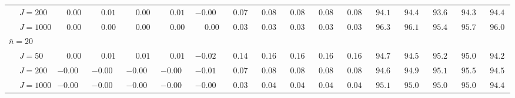 \begin{sidewaystable}
\begin{threeparttable}
\begin{tabular}{llccccccccccccccc}
 & \nopagebreak $\;J=200$  & $\phantom{-}0.00\phantom{0}$ & $\phantom{-}0.01\phantom{0}$ & $\phantom{-}0.00\phantom{0}$ & $\phantom{-}0.01\phantom{0}$ & ${-}0.00\phantom{0}$ & $\phantom{0}0.07\phantom{0}$ & $\phantom{0}0.08\phantom{0}$ & $\phantom{0}0.08\phantom{0}$ & $\phantom{0}0.08\phantom{0}$ & $\phantom{0}0.08\phantom{0}$ & $\phantom{0}94.1\phantom{0}$ & $\phantom{0}94.4\phantom{0}$ & $\phantom{0}93.6\phantom{0}$ & $\phantom{0}94.3\phantom{0}$ & $\phantom{0}94.4\phantom{0}$ \\
 & \nopagebreak $\;J=1000$  & $\phantom{-}0.00\phantom{0}$ & $\phantom{-}0.00\phantom{0}$ & $\phantom{-}0.00\phantom{0}$ & $\phantom{-}0.00\phantom{0}$ & $\phantom{-}0.00\phantom{0}$ & $\phantom{0}0.03\phantom{0}$ & $\phantom{0}0.03\phantom{0}$ & $\phantom{0}0.03\phantom{0}$ & $\phantom{0}0.03\phantom{0}$ & $\phantom{0}0.03\phantom{0}$ & $\phantom{0}96.3\phantom{0}$ & $\phantom{0}96.1\phantom{0}$ & $\phantom{0}95.4\phantom{0}$ & $\phantom{0}95.7\phantom{0}$ & $\phantom{0}96.0\phantom{0}$ \\
\multicolumn{4}{l}{$\bar{n}=20$} \\  & \nopagebreak $\;J=50$  & $\phantom{-}0.00\phantom{0}$ & $\phantom{-}0.01\phantom{0}$ & $\phantom{-}0.01\phantom{0}$ & $\phantom{-}0.01\phantom{0}$ & ${-}0.02\phantom{0}$ & $\phantom{0}0.14\phantom{0}$ & $\phantom{0}0.16\phantom{0}$ & $\phantom{0}0.16\phantom{0}$ & $\phantom{0}0.16\phantom{0}$ & $\phantom{0}0.16\phantom{0}$ & $\phantom{0}94.7\phantom{0}$ & $\phantom{0}94.5\phantom{0}$ & $\phantom{0}95.2\phantom{0}$ & $\phantom{0}95.0\phantom{0}$ & $\phantom{0}94.2\phantom{0}$ \\
 & \nopagebreak $\;J=200$  & ${-}0.00\phantom{0}$ & ${-}0.00\phantom{0}$ & ${-}0.00\phantom{0}$ & ${-}0.00\phantom{0}$ & ${-}0.01\phantom{0}$ & $\phantom{0}0.07\phantom{0}$ & $\phantom{0}0.08\phantom{0}$ & $\phantom{0}0.08\phantom{0}$ & $\phantom{0}0.08\phantom{0}$ & $\phantom{0}0.08\phantom{0}$ & $\phantom{0}94.6\phantom{0}$ & $\phantom{0}94.9\phantom{0}$ & $\phantom{0}95.1\phantom{0}$ & $\phantom{0}95.5\phantom{0}$ & $\phantom{0}94.5\phantom{0}$ \\
 & \nopagebreak $\;J=1000$  & ${-}0.00\phantom{0}$ & ${-}0.00\phantom{0}$ & ${-}0.00\phantom{0}$ & ${-}0.00\phantom{0}$ & ${-}0.00\phantom{0}$ & $\phantom{0}0.03\phantom{0}$ & $\phantom{0}0.04\phantom{0}$ & $\phantom{0}0.04\phantom{0}$ & $\phantom{0}0.04\phantom{0}$ & $\phantom{0}0.04\phantom{0}$ & $\phantom{0}95.1\phantom{0}$ & $\phantom{0}95.0\phantom{0}$ & $\phantom{0}95.0\phantom{0}$ & $\phantom{0}95.0\phantom{0}$ & $\phantom{0}94.4\phantom{0}$ \\

\end{tabular}
\end{threeparttable}
\end{sidewaystable}
